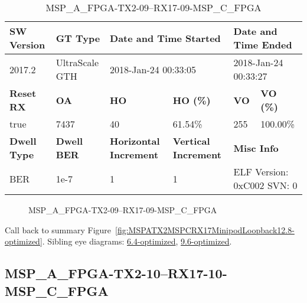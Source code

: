 \begin{table}[h]
\centering
\caption{MSP\_A\_FPGA-TX2-09--RX17-09-MSP\_C\_FPGA}
\label{tab:MSPAFPGATX209RX1709MSPCFPGA12.8-optimized}
\begin{tabular}{@{}|l|l|l|l|l|l|@{}}
\toprule
\textbf{SW Version}                & \textbf{GT Type}   & \multicolumn{2}{l|}{\textbf{Date and Time Started}}            & \multicolumn{2}{l|}{\textbf{Date and Time Ended}}        \\ \midrule
2017.2                       & UltraScale GTH          & \multicolumn{2}{l|}{2018-Jan-24 00:33:05}                   & \multicolumn{2}{l|}{2018-Jan-24 00:33:27}               \\ \midrule
\textbf{Reset RX}                  & \textbf{OA} & \textbf{HO}   & \textbf{HO (\%)} & \textbf{VO} & \textbf{VO (\%)} \\ \midrule
true & 7437        & 40          & 61.54\%        & 255        & 100.00\%       \\ \midrule
\textbf{Dwell Type}                & \textbf{Dwell BER} & \textbf{Horizontal Increment} & \textbf{Vertical Increment}    & \multicolumn{2}{l|}{\textbf{Misc Info}}                  \\ \midrule
BER                            & 1e-7        & 1        & 1           & \multicolumn{2}{l|}{ELF Version: 0xC002 SVN: 0}                         \\ \bottomrule
\end{tabular}
\end{table}

\begin{figure}[h]
\caption{MSP\_A\_FPGA-TX2-09--RX17-09-MSP\_C\_FPGA} \label{fig:MSPAFPGATX209RX1709MSPCFPGA12.8-optimized}
\end{figure}

Call back to summary Figure~\ref{fig:MSPATX2MSPCRX17MinipodLoopback12.8-optimized}.
Sibling eye diagrams: \hyperref[sec:MSPAFPGATX209RX1709MSPCFPGA6.4-optimized]{6.4-optimized}, \hyperref[sec:MSPAFPGATX209RX1709MSPCFPGA9.6-optimized]{9.6-optimized}.

\clearpage
\newpage


\subsection{MSP\_A\_FPGA-TX2-10--RX17-10-MSP\_C\_FPGA}\label{sec:MSPAFPGATX210RX1710MSPCFPGA12.8-optimized}

